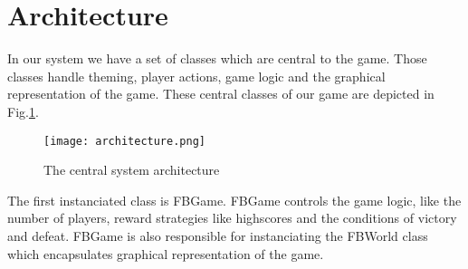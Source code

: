 \section{Architecture}
In our system we have a set of classes which are central to the 
game. Those classes handle theming, player actions, game logic 
and the graphical representation of the game. These central
classes of our game are depicted in Fig.\ref{fig:architecture}.
%
\begin{figure}[tbh]
  \begin{center}
    \texttt{[image: architecture.png]}
  \end{center}
  \caption{The central system architecture}
  \label{fig:architecture}
\end{figure}
%
The first instanciated class is FBGame. FBGame controls the game logic, 
like the number of players, reward strategies like highscores and the
conditions of victory and defeat. FBGame is also responsible for instanciating
the FBWorld class which encapsulates graphical representation of the game.


